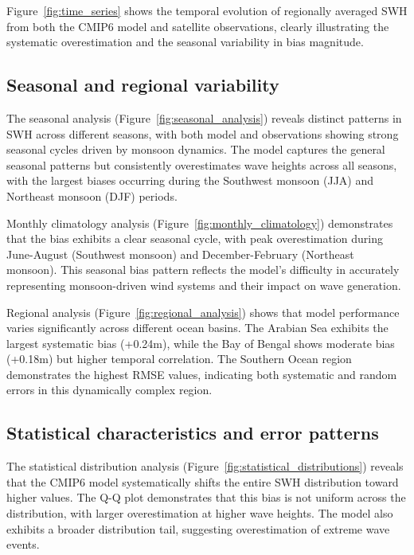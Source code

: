 \documentclass[twocolumn]{article}
\begin{document}
 Figure~\ref{fig:time_series} shows the temporal evolution of regionally averaged SWH from both the CMIP6 model and satellite observations, clearly illustrating the systematic overestimation and the seasonal variability in bias magnitude.

 \subsection{Seasonal and regional variability}
 
 The seasonal analysis (Figure~\ref{fig:seasonal_analysis}) reveals distinct patterns in SWH across different seasons, with both model and observations showing strong seasonal cycles driven by monsoon dynamics. The model captures the general seasonal patterns but consistently overestimates wave heights across all seasons, with the largest biases occurring during the Southwest monsoon (JJA) and Northeast monsoon (DJF) periods.
 
 Monthly climatology analysis (Figure~\ref{fig:monthly_climatology}) demonstrates that the bias exhibits a clear seasonal cycle, with peak overestimation during June-August (Southwest monsoon) and December-February (Northeast monsoon). This seasonal bias pattern reflects the model's difficulty in accurately representing monsoon-driven wind systems and their impact on wave generation.
 
 Regional analysis (Figure~\ref{fig:regional_analysis}) shows that model performance varies significantly across different ocean basins. The Arabian Sea exhibits the largest systematic bias (+0.24m), while the Bay of Bengal shows moderate bias (+0.18m) but higher temporal correlation. The Southern Ocean region demonstrates the highest RMSE values, indicating both systematic and random errors in this dynamically complex region.

 \subsection{Statistical characteristics and error patterns}
 
 The statistical distribution analysis (Figure~\ref{fig:statistical_distributions}) reveals that the CMIP6 model systematically shifts the entire SWH distribution toward higher values. The Q-Q plot demonstrates that this bias is not uniform across the distribution, with larger overestimation at higher wave heights. The model also exhibits a broader distribution tail, suggesting overestimation of extreme wave events.
 
\end{document}
